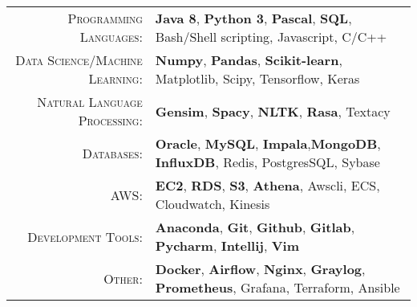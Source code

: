 %
%
%

\renewcommand{\arraystretch}{1.1}
	\begin{tabular}{>{}r>{}p{13cm}} 
		\textsc{Programming Languages:}  		&   \textbf{Java 8}, \textbf{Python 3}, \textbf{Pascal}, \textbf{SQL}, Bash/Shell scripting, Javascript, C/C++ \\ 
		\textsc{Data Science/Machine Learning:}                  &   \textbf{Numpy}, \textbf{Pandas}, \textbf{Scikit-learn}, Matplotlib, Scipy, Tensorflow, Keras\\
		\textsc{Natural Language Processing:} 	 & \textbf{Gensim}, \textbf{Spacy}, \textbf{NLTK}, \textbf{Rasa}, Textacy\\
		\textsc{Databases:}                  &   \textbf{Oracle}, \textbf{MySQL}, \textbf{Impala},\textbf{MongoDB}, \textbf{InfluxDB}, Redis, PostgresSQL, Sybase \\ 		
		\textsc{AWS:}                  &   \textbf{EC2}, \textbf{RDS}, \textbf{S3}, \textbf{Athena}, Awscli, ECS, Cloudwatch, Kinesis \\ 
		\textsc{Development Tools:} & 	  		\textbf{Anaconda}, \textbf{Git}, \textbf{Github}, \textbf{Gitlab}, \textbf{Pycharm}, \textbf{Intellij}, \textbf{Vim}  \\		
		\textsc{Other:}  &                       \textbf{Docker}, \textbf{Airflow}, \textbf{Nginx}, \textbf{Graylog}, \textbf{Prometheus}, Grafana, Terraform, Ansible \\
	\end{tabular}
